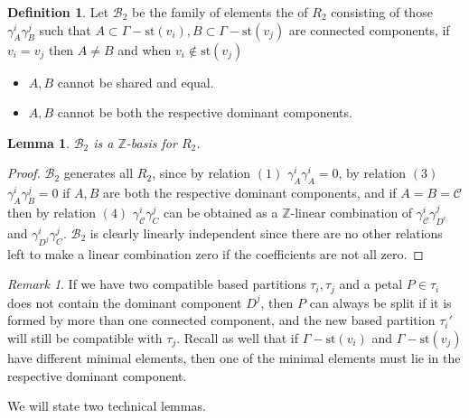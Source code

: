 \documentclass[a4paper]{amsart}
\newcommand{\G}{\Gamma}
\newcommand{\B}{\mathcal{B}}
\newcommand{\C}{\mathcal{C}}
\newcommand{\st}{\mathrm{st}}
\newtheorem{lem}[teo]{Lemma}
\theoremstyle{definition}
\newtheorem{defi}[teo]{Definition}
\theoremstyle{remark}
\newtheorem*{nota}{Remark}
\begin{document}
\begin{defi}
    Let $\B_2$ be the family of elements the  of $R_2$ consisting of those $\gamma_A^i\gamma_B^j$ such that $A\subset \G-\st(v_i), B\subset\G-\st(v_j)$ are connected components,  if $v_i=v_j$ then $A\neq B$ and when $v_i\notin\st(v_j)$
    \begin{itemize}
        \item $A,B$ cannot be shared and equal.
        \item $A,B$ cannot be both the respective dominant components.
    \end{itemize}
\end{defi}


\begin{lem}
    $\B_2$ is a $\mathbb{Z}$-basis for $R_2$.
\end{lem}

\begin{proof}
    $\B_2$ generates all $R_2$, since by relation $(1)$ $ \gamma_A^i\gamma_A^i=0$, by relation $(3)$ $\gamma_A^i\gamma_B^j=0$ if $A,B$ are both the respective dominant components, and if $A=B=\C$ then by relation $(4)$ $\gamma_\C^i\gamma_C^j$ can be obtained as a $\mathbb{Z}$-linear combination of $\gamma_\C^i\gamma_{D^i}^j$ and $\gamma_{D^j}^i\gamma_C^j$. $\B_2$ is clearly linearly independent since there are no other relations left to make a linear combination zero if the coefficients are not all zero.
\end{proof}

\begin{nota}
    If we have two compatible based partitions $\tau_i,\tau_j$ and a petal $P\in\tau_i$ does not contain the dominant component $D^j$, then $P$ can always be split if it is formed by more than one connected component, and the new based partition $\tau_i'$ will still be compatible with $\tau_j$. Recall as well that if $\G-\st(v_i)$ and $\G-\st(v_j)$ have different minimal elements, then one of the minimal elements must lie in the respective dominant component.
\end{nota}

We will state two technical lemmas.
\end{document}
